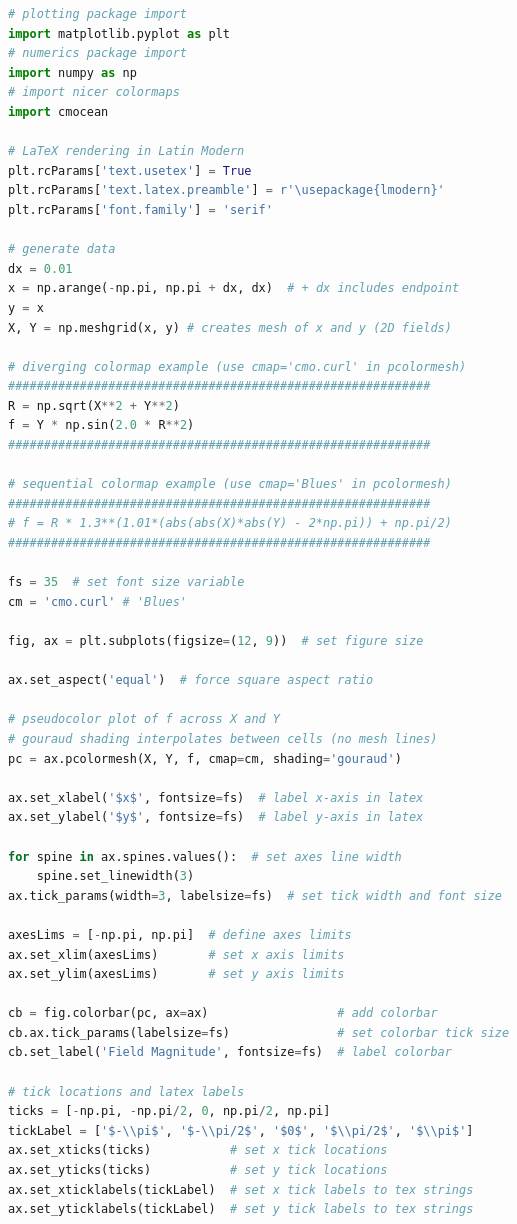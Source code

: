  \begin{lstlisting}[language=python]
# plotting package import
import matplotlib.pyplot as plt
# numerics package import
import numpy as np
# import nicer colormaps
import cmocean

# LaTeX rendering in Latin Modern
plt.rcParams['text.usetex'] = True
plt.rcParams['text.latex.preamble'] = r'\usepackage{lmodern}'
plt.rcParams['font.family'] = 'serif'

# generate data
dx = 0.01
x = np.arange(-np.pi, np.pi + dx, dx)  # + dx includes endpoint
y = x
X, Y = np.meshgrid(x, y) # creates mesh of x and y (2D fields)

# diverging colormap example (use cmap='cmo.curl' in pcolormesh)
###########################################################
R = np.sqrt(X**2 + Y**2)
f = Y * np.sin(2.0 * R**2)
###########################################################

# sequential colormap example (use cmap='Blues' in pcolormesh)
###########################################################
# f = R * 1.3**(1.01*(abs(abs(X)*abs(Y) - 2*np.pi)) + np.pi/2)
###########################################################

fs = 35  # set font size variable
cm = 'cmo.curl' # 'Blues'

fig, ax = plt.subplots(figsize=(12, 9))  # set figure size

ax.set_aspect('equal')  # force square aspect ratio

# pseudocolor plot of f across X and Y
# gouraud shading interpolates between cells (no mesh lines)
pc = ax.pcolormesh(X, Y, f, cmap=cm, shading='gouraud')

ax.set_xlabel('$x$', fontsize=fs)  # label x-axis in latex
ax.set_ylabel('$y$', fontsize=fs)  # label y-axis in latex

for spine in ax.spines.values():  # set axes line width
    spine.set_linewidth(3)
ax.tick_params(width=3, labelsize=fs)  # set tick width and font size

axesLims = [-np.pi, np.pi]  # define axes limits
ax.set_xlim(axesLims)       # set x axis limits
ax.set_ylim(axesLims)       # set y axis limits

cb = fig.colorbar(pc, ax=ax)                  # add colorbar
cb.ax.tick_params(labelsize=fs)               # set colorbar tick size
cb.set_label('Field Magnitude', fontsize=fs)  # label colorbar

# tick locations and latex labels
ticks = [-np.pi, -np.pi/2, 0, np.pi/2, np.pi]
tickLabel = ['$-\\pi$', '$-\\pi/2$', '$0$', '$\\pi/2$', '$\\pi$']
ax.set_xticks(ticks)           # set x tick locations
ax.set_yticks(ticks)           # set y tick locations
ax.set_xticklabels(tickLabel)  # set x tick labels to tex strings
ax.set_yticklabels(tickLabel)  # set y tick labels to tex strings


\end{lstlisting}
